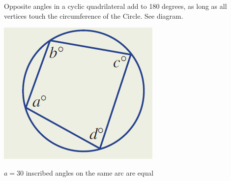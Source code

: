 \documentclass{report}
\begin{document}
{\begin{center}
     \end{center}
     Opposite angles in a cyclic quadrilateral add to 180 degrees, as long as all vertices touch the circumference of the Circle. See diagram.
     \begin{center}
        \includegraphics[scale=0.5]{cyclicquadangle.png}
     \end{center}
}
\begin{center}
    $a = 30$ inscribed angles on the same arc are equal
 \end{center}
\end{document}
